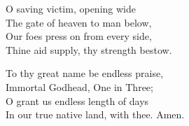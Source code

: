 \documentclass[11pt]{book}
\begin{document}
\thispagestyle{empty}


{}

\begin{multicols}{2}
\raggedcolumns
\begin{otherlanguage}{english}
O saving victim, opening wide\\
The gate of heaven to man below,\\
Our foes press on from every side,\\
Thine aid supply, thy strength bestow.

To thy great name be endless praise,\\
Immortal Godhead, One in Three;\\
O grant us endless length of days\\
In our true native land, with thee.
Amen.
\end{otherlanguage}
\end{multicols}
\end{document}
